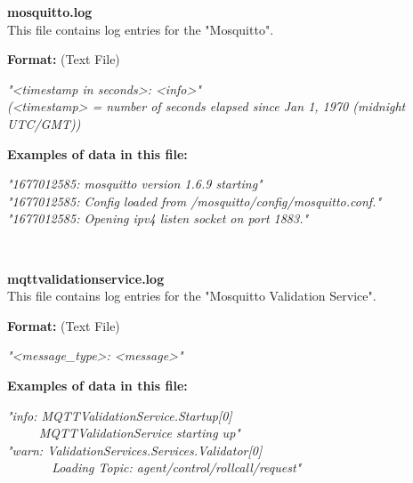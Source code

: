 \begin{description}
\begin{addmargin}[0em]{0em}
    \label{mosquitto.log}
    \begin{addmargin}[1em]{0em} %
        \textbf{mosquitto.log}\\
        This file contains log entries for the "Mosquitto".
        \begin{addmargin}[1em]{0em}
            \textbf{Format:} (Text File)
            \begin{addmargin}[1em]{0em}
                \textit{"<timestamp in seconds>: <info>"\\
                (<timestamp> = number of seconds elapsed since Jan 1, 1970 (midnight UTC/GMT))}
            \end{addmargin}
        \end{addmargin}
        \begin{addmargin}[1em]{0em}
            \textbf{Examples of data in this file:}
            \begin{addmargin}[1em]{0em}\textit{"1677012585: mosquitto version 1.6.9 starting"\\
                "1677012585: Config loaded from /mosquitto/config/mosquitto.conf."\\
                "1677012585: Opening ipv4 listen socket on port 1883."}
            \end{addmargin}
        \end{addmargin}
    \end{addmargin} %
    \textbf{\\}

    \label{mqttvalidationservice.log}
    \begin{addmargin}[1em]{0em} %
        \textbf{mqttvalidationservice.log}\\
        This file contains log entries for the "Mosquitto Validation Service".
        \begin{addmargin}[1em]{0em}
            \textbf{Format:} (Text File)
            \begin{addmargin}[1em]{0em}
                \textit{"<message\_type>: <message>"}
            \end{addmargin}
        \end{addmargin}
        \begin{addmargin}[1em]{0em}
            \textbf{Examples of data in this file:}
            \begin{addmargin}[1em]{0em}\textit{"info: MQTTValidationService.Startup[0]}\\
                \verb|     |\textit{MQTTValidationService starting up"}\\
                \textit{"warn: ValidationServices.Services.Validator[0]}\\
                \verb|       |\textit{Loading Topic: agent/control/rollcall/request"}
            \end{addmargin}
        \end{addmargin}
    \end{addmargin} %
    \textbf{\\}


\end{addmargin}
\end{description}
